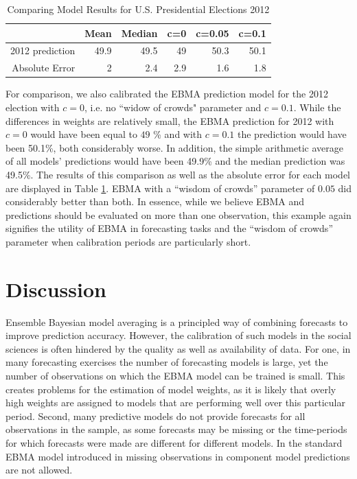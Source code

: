 \documentclass[12pt,fullpage,endnotes]{article}
\begin{document}
\begin{table}[ht]
\caption{Comparing Model Results for U.S. Presidential Elections 2012}
\label{presModel12}
\begin{center}
\begin{tabular}{rrrrrr}
  \toprule
 & Mean & Median & c=0 & c=0.05 & c=0.1 \\ 
  \midrule
2012 prediction & 49.9 & 49.5 & 49 & 50.3 & 50.1 \\ 
  Absolute Error & 2 & 2.4 & 2.9 & 1.6 & 1.8 \\ 
   \bottomrule
\end{tabular}
\end{center}
\end{table}


For comparison, we also calibrated the EBMA prediction model for the 2012 election with $c=0$, i.e. no ``widow of crowds" parameter and $c=0.1$. While the differences in weights are relatively small, the EBMA prediction for 2012 with $c=0$ would have been equal to $49$ \% and with $c=0.1$ the prediction would have been 50.1\%, both considerably worse. In addition, the simple arithmetic average of all models' predictions would have been 49.9\% and the median prediction was 49.5\%. The results of this comparison as well as the absolute error for each model are displayed in Table \ref{presModel12}. EBMA with a ``wisdom of crowds'' parameter of $0.05$ did considerably better than both. In essence, while we believe EBMA and predictions should be evaluated on more than one observation, this example again signifies the utility of EBMA in forecasting tasks and the ``wisdom of crowds'' parameter when calibration periods are particularly short. 


\section{Discussion} 
Ensemble Bayesian model averaging is a principled way of combining
forecasts to improve prediction accuracy. However, the calibration of
such models in the social sciences is often hindered by the quality as
well as availability of data. For one, in many forecasting exercises
the number of forecasting models is large, yet the number of
observations on which the EBMA model can be trained is small. This
creates problems for the estimation of model weights, as it is likely
that overly high weights are assigned to models that are performing
well over this particular period. Second, many predictive models do
not provide forecasts for all observations in the sample, as some
forecasts may be missing or the time-periods for which forecasts were
made are different for different models. In the standard EBMA model
introduced in \citet{mhw:2012} missing observations in component model
predictions are not allowed.
\end{document}
